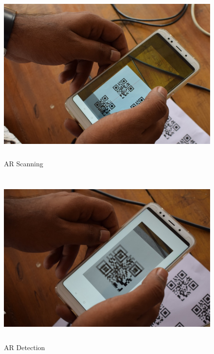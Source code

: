 \begin{figure}[H]
	
	\centering
	\includegraphics[width=\linewidth,height=9cm] {./images/p38.jpg}
	\caption{AR Scanning}
	\label{manual}
\end{figure}

\begin{figure}[H]
	
	\centering
	\includegraphics[width=\linewidth,height=9cm] {./images/p39.jpg}
	\caption{AR Detection}
	\label{manual}
\end{figure}


